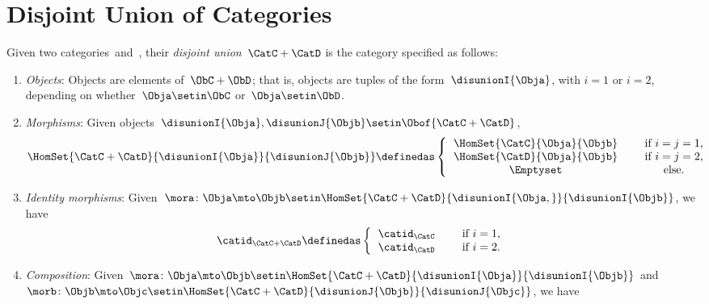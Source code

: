 
\section{Disjoint Union of Categories}

\begin{ctdefinition}
    \label{def:disjoint-union-category}
    Given two categories~\CatC and~\CatD, their \emph{disjoint union}~$\CatC + \CatD$ is the category specified as follows:
    \begin{enumerate}
        \item \emph{Objects}: Objects are elements of~$\ObC + \ObD$; that is, objects are tuples of the form~$\disunionI{\Obja}$, with $i=1$ or $i=2$, depending on whether~$\Obja \setin \ObC$ or~$\Obja \setin \ObD$.
        \item \emph{Morphisms}: Given objects~$\disunionI{\Obja}, \disunionJ{\Objb} \setin \Obof{\CatC + \CatD}$,
              \begin{equation}
                  \HomSet{\CatC + \CatD}{\disunionI{\Obja}}{\disunionJ{\Objb}} \definedas
                  \left\{
                  \begin{tabular}{ccc}
                      $\HomSet{\CatC}{\Obja}{\Objb}$ &  & if $i=j = 1$, \\
                      $\HomSet{\CatD}{\Obja}{\Objb}$ &  & if $i = j =2$, \\
                      $\Emptyset$                    &  & else.
                  \end{tabular}
                  \right.{}
              \end{equation}
        \item \emph{Identity morphisms}: Given~$\mora\colon \Obja \mto \Objb\setin \HomSet{\CatC + \CatD}{\disunionI{\Obja, }}{\disunionI{\Objb}}$, we have
              \begin{equation}
                  \catid_{\CatC+\CatD} \definedas
                  \left\{
                  \begin{tabular}{ccc}
                      $\catid_\CatC$ &  & if $i=1$, \\
                      $\catid_\CatD$ &  & if $i=2$.
                  \end{tabular}
                  \right.{}
              \end{equation}
        \item \emph{Composition}: Given~$\mora\colon \Obja \mto \Objb\setin \HomSet{\CatC + \CatD}{\disunionI{\Obja}}{\disunionI{\Objb}}$ and~$\morb\colon \Objb\mto \Objc\setin \HomSet{\CatC + \CatD}{\disunionJ{\Objb}}{\disunionJ{\Objc}}$, we have

\end{enumerate}
\end{ctdefinition}
